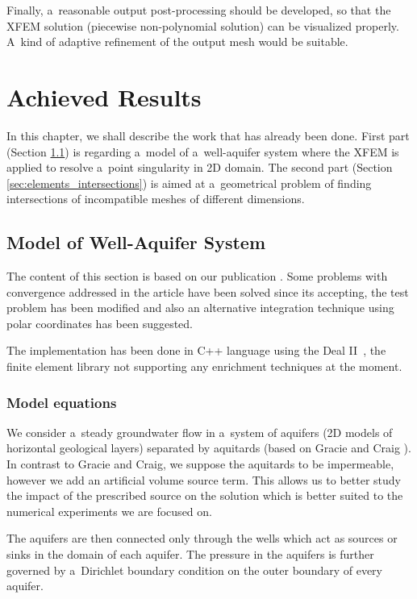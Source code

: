 \documentclass[FM,Dis]{tulthesis}
\begin{document}
Finally, a~reasonable output post-processing should be developed, so that the XFEM solution (piecewise non-polynomial solution)
can be visualized properly. A~kind of adaptive refinement of the output mesh would be suitable.






\chapter{Achieved Results} \label{chap:results}
In this chapter, we shall describe the work that has already been done. First part (Section \ref{sec:model_aquifer}) 
is regarding a~model of a~well-aquifer system where the XFEM is applied to resolve a~point singularity in 2D domain. 
The second part (Section \ref{sec:elements_intersections}) is aimed at a~geometrical problem of finding 
intersections of incompatible meshes of different dimensions.

\section{Model of Well-Aquifer System} 
\label{sec:model_aquifer}
The content of this section is based on our publication \cite{exner_2016}. Some problems with convergence addressed in the article
have been solved since its accepting, the test problem has been modified and also an alternative integration technique
using polar coordinates has been suggested.

The implementation has been done in C++ language using the Deal II~\cite{bangerth_deal.ii_2007}, 
the finite element library not supporting any enrichment techniques at the moment.

\subsection{Model equations}
We consider a~steady groundwater flow in a~system of aquifers (2D models of horizontal geological layers) separated by aquitards
(based on Gracie and Craig \cite{gracie_modelling_2010,craig_using_2011}).
In contrast to Gracie and Craig, we suppose the aquitards to be impermeable, 
however we add an artificial volume source term. This allows us to better study the impact of 
the prescribed source on the solution which is better suited to the numerical experiments we are focused on. 

The aquifers are then connected only through the wells 
which act as sources or sinks in the domain of each aquifer. The pressure in the aquifers is further governed 
by a~Dirichlet boundary condition on the outer boundary of every aquifer.
\end{document}
